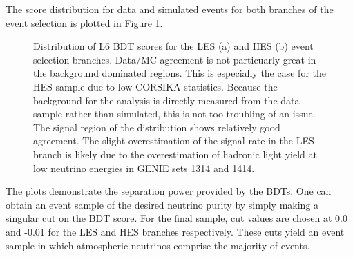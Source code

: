 \documentclass{gatech-thesis}
\begin{document}
The score distribution for data and simulated events for both branches of the event selection is plotted in Figure \ref{fig:BDTScoreDistros}.
\begin{figure}
\centering
{}
\caption{Distribution of L6 BDT scores for the LES (a) and HES (b) event selection branches. Data/MC agreement is not particuarly great in the background dominated regions. This is especially the case for the HES sample due to low CORSIKA statistics. Because the background for the analysis is directly measured from the data sample rather than simulated, this is not too troubling of an issue. The signal region of the distribution shows relatively good agreement. The slight overestimation of the signal rate in the LES branch is likely due to the overestimation of hadronic light yield at low neutrino energies in GENIE sets 1314 and 1414.}
\label{fig:BDTScoreDistros}
\end{figure}
The plots demonstrate the separation power provided by the BDTs. One can obtain an event sample of the desired neutrino purity by simply making a singular cut on the BDT score. For the final sample, cut values are chosen at 0.0 and -0.01 for the LES and HES branches respectively. These cuts yield an event sample in which atmospheric neutrinos comprise the majority of events.
\end{document}
